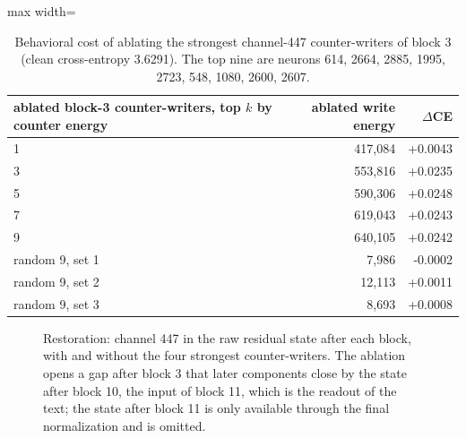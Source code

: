 \begin{table}[H]\centering\small
\caption{Behavioral cost of ablating the strongest channel-447 counter-writers of block 3 (clean cross-entropy 3.6291). The top nine are neurons 614, 2664, 2885, 1995, 2723, 548, 1080, 2600, 2607.}\label{app:ablate}
\begin{adjustbox}{max width=\linewidth}
\begin{tabular}{lrr}\toprule
ablated block-3 counter-writers, top $k$ by counter energy & ablated write energy & $\Delta$CE \\ \midrule
1 & 417,084 & +0.0043 \\
3 & 553,816 & +0.0235 \\
5 & 590,306 & +0.0248 \\
7 & 619,043 & +0.0243 \\
9 & 640,105 & +0.0242 \\
random 9, set 1 & 7,986 & -0.0002 \\
random 9, set 2 & 12,113 & +0.0011 \\
random 9, set 3 & 8,693 & +0.0008 \\
\bottomrule\end{tabular}\end{adjustbox}
\end{table}
\begin{figure}[H]\centering{}\caption{Restoration: channel 447 in the raw residual state after each block, with and without the four strongest counter-writers. The ablation opens a gap after block 3 that later components close by the state after block 10, the input of block 11, which is the readout of the text; the state after block 11 is only available through the final normalization and is omitted.}\label{app:traj}\end{figure}
